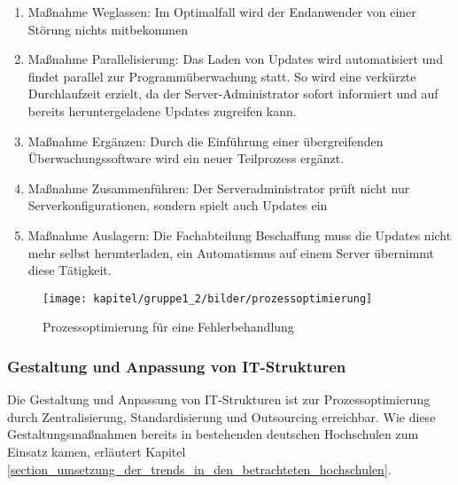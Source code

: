\begin{enumerate}
	\item Maßnahme Weglassen: Im Optimalfall wird der Endanwender von einer Störung nichts mitbekommen
	\item Maßnahme Parallelisierung: Das Laden von Updates wird automatisiert und findet parallel zur Programmüberwachung statt. So wird eine verkürzte Durchlaufzeit erzielt, da der Server-Administrator sofort informiert und auf bereits heruntergeladene Updates zugreifen kann.
	\item Maßnahme Ergänzen: Durch die Einführung einer übergreifenden Überwachungssoftware wird ein neuer Teilprozess ergänzt.
	\item Maßnahme Zusammenführen: Der Serveradministrator prüft nicht nur Serverkonfigurationen, sondern spielt auch Updates ein
	\item Maßnahme Auslagern: Die Fachabteilung Beschaffung muss die Updates nicht mehr selbst herunterladen, ein Automatismus auf einem Server übernimmt diese Tätigkeit.
\end{enumerate}


\begin{figure}[h!]
	\centering
	\texttt{[image: kapitel/gruppe1\_2/bilder/prozessoptimierung]} 
	\caption{Prozessoptimierung für eine Fehlerbehandlung}
	\label{fig_prozessoptimierung}
\end{figure}



\subsubsection{Gestaltung und Anpassung von IT-Strukturen}
\label{subsubsection_gestaltung_IT_strukturen}
Die Gestaltung und Anpassung von IT-Strukturen ist zur Prozessoptimierung durch Zentralisierung, Standardisierung und Outsourcing erreichbar. Wie diese Gestaltungsmaßnahmen bereits in bestehenden deutschen Hochschulen zum Einsatz kamen, erläutert Kapitel \ref{section_umsetzung_der_trends_in_den_betrachteten_hochschulen}.


